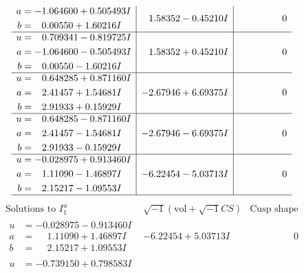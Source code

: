 \documentclass[1p]{elsarticle_modified}
\theoremstyle{definition}
\newcommand{\I}{\sqrt{-1}}
\begin{document}
$$\begin{array}{c|c|c}
\begin{aligned}
a &= -1.064600 + 0.505493 I \\
b &= \phantom{-}0.00550 + 1.60216 I\end{aligned}
 & \phantom{-}1.58352 - 0.45210 I & \phantom{-0.000000 } 0 \\ \hline\begin{aligned}
u &= \phantom{-}0.709341 - 0.819725 I \\
a &= -1.064600 - 0.505493 I \\
b &= \phantom{-}0.00550 - 1.60216 I\end{aligned}
 & \phantom{-}1.58352 + 0.45210 I & \phantom{-0.000000 } 0 \\ \hline\begin{aligned}
u &= \phantom{-}0.648285 + 0.871160 I \\
a &= \phantom{-}2.41457 + 1.54681 I \\
b &= \phantom{-}2.91933 + 0.15929 I\end{aligned}
 & -2.67946 + 6.69375 I & \phantom{-0.000000 } 0 \\ \hline\begin{aligned}
u &= \phantom{-}0.648285 - 0.871160 I \\
a &= \phantom{-}2.41457 - 1.54681 I \\
b &= \phantom{-}2.91933 - 0.15929 I\end{aligned}
 & -2.67946 - 6.69375 I & \phantom{-0.000000 } 0 \\ \hline\begin{aligned}
u &= -0.028975 + 0.913460 I \\
a &= \phantom{-}1.11090 - 1.46897 I \\
b &= \phantom{-}2.15217 - 1.09553 I\end{aligned}
 & -6.22454 - 5.03713 I & \phantom{-0.000000 } 0\\
 \hline 
 \end{array}$$\newpage$$\begin{array}{c|c|c}  
\text{Solutions to }I^u_{1}& \I (\text{vol} + \sqrt{-1}CS) & \text{Cusp shape}\\
 \hline 
\begin{aligned}
u &= -0.028975 - 0.913460 I \\
a &= \phantom{-}1.11090 + 1.46897 I \\
b &= \phantom{-}2.15217 + 1.09553 I\end{aligned}
 & -6.22454 + 5.03713 I & \phantom{-0.000000 } 0 \\ \hline\begin{aligned}
u &= -0.739150 + 0.798583 I \\

\end{aligned}
\end{array}$$
\end{document}
